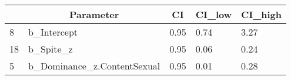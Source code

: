 \documentclass[
  english,
  a4paper]{apa7}
\begin{document}
\begin{table}[tbp]

\begin{center}
\begin{threeparttable}

\caption{\label{tab:unnamed-chunk-2}}

\begin{tabular}{lllll}
\toprule
 & \multicolumn{1}{c}{Parameter} & \multicolumn{1}{c}{CI} & \multicolumn{1}{c}{CI\_low} & \multicolumn{1}{c}{CI\_high}\\
\midrule
8 & b\_Intercept & 0.95 & 0.74 & 3.27\\
18 & b\_Spite\_z & 0.95 & 0.06 & 0.24\\
5 & b\_Dominance\_z.ContentSexual & 0.95 & 0.01 & 0.28\\
\bottomrule
\end{tabular}

\end{threeparttable}
\end{center}

\end{table}
\end{document}
